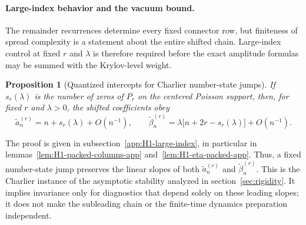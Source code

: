 \documentclass[a4paper,11pt]{article}
\newtheorem{proposition}{Proposition}[section]
\theoremstyle{definition}
\theoremstyle{remark}
\begin{document}
\paragraph{Large-index behavior and the vacuum bound.}
The remainder recurrences determine every fixed connector row, but finiteness of spread complexity is a statement about the entire shifted chain. Large-index control at fixed $r$ and $\lambda$ is therefore required before the exact amplitude formulas may be summed with the Krylov-level weight. 
\begin{proposition}[Quantized intercepts for Charlier number-state jumps]
\label{prop:H1-intercepts-main}
If $s_r(\lambda)$ is the number of zeros of $P_r$ on the centered Poisson support, then, for fixed $r$ and $\lambda>0$, the shifted coefficients obey
\begin{equation}
   \widetilde a_n^{(r)}=n+s_r(\lambda)+O(n^{-1}),\qquad
   \widetilde\beta_n^{(r)}=
   \lambda\bigl[n+2r-s_r(\lambda)\bigr]+O(n^{-1}).
   \label{eq:H1-Jacobi-asymptotics-main}
\end{equation}
\end{proposition}
The proof is given in subsection~\ref{app:H1-large-index}, in particular in
lemmas~\ref{lem:H1-packed-columns-app} and~\ref{lem:H1-eta-packed-app}.
Thus, a fixed number-state jump preserves the linear slopes of both $\widetilde a_n^{(r)}$ and $\widetilde\beta_n^{(r)}$.
This is the Charlier instance of the asymptotic stability analyzed in
section~\ref{sec:rigidity}.  It implies invariance only for diagnostics that depend solely on
these leading slopes; it does not make the subleading chain or the finite-time dynamics
preparation independent.
\end{document}
